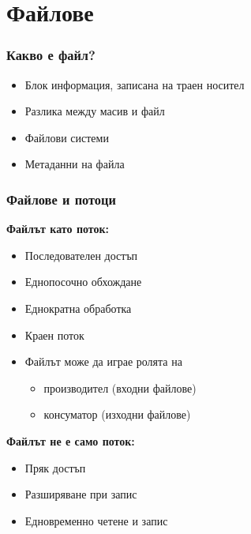 \documentclass{beamer}
\begin{document}
\section{Файлове}

\begin{frame}
  \frametitle{Какво е файл?}

  \begin{itemize}[<+->]
  \item Блок информация, записана на траен носител
  \item Разлика между масив и файл
  \item Файлови системи
  \item Метаданни на файла
  \end{itemize}
\end{frame}

\begin{frame}
  \frametitle{Файлове и потоци}

  \textbf{Файлът като поток:}
  \begin{itemize}[<+->]
  \item Последователен достъп
  \item Еднопосочно обхождане
  \item Еднократна обработка
  \item Краен поток
  \item Файлът може да играе ролята на
    \begin{itemize}
    \item производител (входни файлове)
    \item консуматор (изходни файлове)
    \end{itemize}
  \end{itemize}

  \onslide<+->
  \textbf{Файлът не е само поток:}
  \begin{itemize}[<+->]
  \item Пряк достъп
  \item Разширяване при запис
  \item Едновременно четене и запис
  \end{itemize}
\end{frame}
\end{document}
